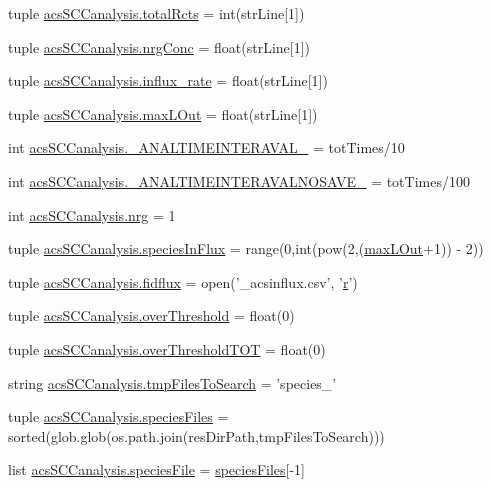 \begin{DoxyCompactItemize}
\item 
tuple \hyperlink{a00096_a9f0e87ff21f3597668f5ad076224da87}{acs\-S\-C\-Canalysis.\-total\-Rcts} = int(str\-Line\mbox{[}1\mbox{]})
\item 
tuple \hyperlink{a00096_a24d5f5a61d56c596017396ad272ef4a4}{acs\-S\-C\-Canalysis.\-nrg\-Conc} = float(str\-Line\mbox{[}1\mbox{]})
\item 
tuple \hyperlink{a00096_a3a8adee26325d72aca909e91b0fd3ea5}{acs\-S\-C\-Canalysis.\-influx\-\_\-rate} = float(str\-Line\mbox{[}1\mbox{]})
\item 
tuple \hyperlink{a00096_a47da7b9153a0e4a33512f6d2675b8c1a}{acs\-S\-C\-Canalysis.\-max\-L\-Out} = float(str\-Line\mbox{[}1\mbox{]})
\item 
int \hyperlink{a00096_a46f1fb71bdcdb1c8679ae847d0d4b63f}{acs\-S\-C\-Canalysis.\-\_\-\-A\-N\-A\-L\-T\-I\-M\-E\-I\-N\-T\-E\-R\-A\-V\-A\-L\-\_\-} = tot\-Times/10
\item 
int \hyperlink{a00096_a7665e828ed7f27f4ba353e9645ad716d}{acs\-S\-C\-Canalysis.\-\_\-\-A\-N\-A\-L\-T\-I\-M\-E\-I\-N\-T\-E\-R\-A\-V\-A\-L\-N\-O\-S\-A\-V\-E\-\_\-} = tot\-Times/100
\item 
int \hyperlink{a00096_a948683f966c62ac856582281c3cda1f4}{acs\-S\-C\-Canalysis.\-nrg} = 1
\item 
tuple \hyperlink{a00096_a36f6b63269e716f42cd38a36a781a4cf}{acs\-S\-C\-Canalysis.\-species\-In\-Flux} = range(0,int(pow(2,(\hyperlink{a00065_abb126c97fed10420e64f85923bf5e04b}{max\-L\-Out}+1)) -\/ 2))
\item 
tuple \hyperlink{a00096_a0c40e4d9928e8df792b31c7a431d3fba}{acs\-S\-C\-Canalysis.\-fidflux} = open('\-\_\-acsinflux.\-csv', '\hyperlink{a00025_ac862e7284527eb913b1351c8bfb8e079}{r}')
\item 
tuple \hyperlink{a00096_a12e61f8d7aadb52256a7728af342bae3}{acs\-S\-C\-Canalysis.\-over\-Threshold} = float(0)
\item 
tuple \hyperlink{a00096_a93de20dd9ebf791127ac5aefc0a2df8d}{acs\-S\-C\-Canalysis.\-over\-Threshold\-T\-O\-T} = float(0)
\item 
string \hyperlink{a00096_a141356fc914110fdf3ec4f0fc3beaab5}{acs\-S\-C\-Canalysis.\-tmp\-Files\-To\-Search} = 'species\-\_\-'
\item 
tuple \hyperlink{a00096_a4f47408478e9a0590d016df50cf42141}{acs\-S\-C\-Canalysis.\-species\-Files} = sorted(glob.\-glob(os.\-path.\-join(res\-Dir\-Path,tmp\-Files\-To\-Search)))
\item 
list \hyperlink{a00096_a1d066fa24dced2da12ffd9a8514a17ba}{acs\-S\-C\-Canalysis.\-species\-File} = \hyperlink{a00022_af5703745c2c2a6af7f62da460994d9c2}{species\-Files}\mbox{[}-\/1\mbox{]}

\end{DoxyCompactItemize}
